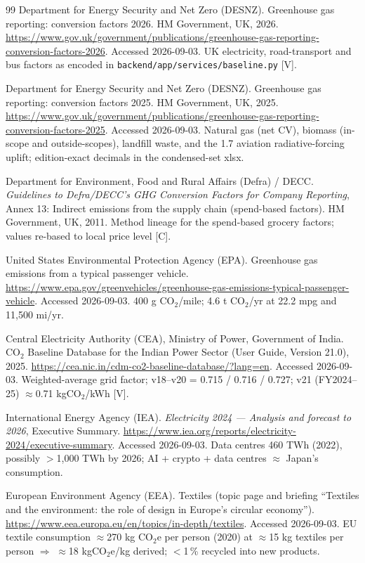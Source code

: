 \documentclass[11pt,a4paper]{article}
\begin{document}
\begin{thebibliography}{99}
Department for Energy Security and Net Zero (DESNZ). Greenhouse gas reporting: conversion factors 2026. HM Government, UK, 2026.
\url{https://www.gov.uk/government/publications/greenhouse-gas-reporting-conversion-factors-2026}. Accessed 2026-09-03.
UK electricity, road-transport and bus factors as encoded in \texttt{backend/app/services/baseline.py} [V].

Department for Energy Security and Net Zero (DESNZ). Greenhouse gas reporting: conversion factors 2025. HM Government, UK, 2025.
\url{https://www.gov.uk/government/publications/greenhouse-gas-reporting-conversion-factors-2025}. Accessed 2026-09-03.
Natural gas (net CV), biomass (in-scope and outside-scopes), landfill waste, and the 1.7 aviation radiative-forcing uplift; edition-exact decimals in the condensed-set xlsx.

Department for Environment, Food and Rural Affairs (Defra) / DECC. \textit{Guidelines to Defra/DECC's GHG Conversion Factors for Company Reporting}, Annex 13: Indirect emissions from the supply chain (spend-based factors). HM Government, UK, 2011.
Method lineage for the spend-based grocery factors; values re-based to local price level [C].

United States Environmental Protection Agency (EPA). Greenhouse gas emissions from a typical passenger vehicle.
\url{https://www.epa.gov/greenvehicles/greenhouse-gas-emissions-typical-passenger-vehicle}. Accessed 2026-09-03.
400 g CO$_2$/mile; 4.6 t CO$_2$/yr at 22.2 mpg and 11{,}500 mi/yr.

Central Electricity Authority (CEA), Ministry of Power, Government of India. CO$_2$ Baseline Database for the Indian Power Sector (User Guide, Version 21.0), 2025.
\url{https://cea.nic.in/cdm-co2-baseline-database/?lang=en}. Accessed 2026-09-03.
Weighted-average grid factor; v18--v20 = 0.715 / 0.716 / 0.727; v21 (FY2024--25) $\approx$0.71 kgCO$_2$/kWh [V].

International Energy Agency (IEA). \textit{Electricity 2024 --- Analysis and forecast to 2026}, Executive Summary.
\url{https://www.iea.org/reports/electricity-2024/executive-summary}. Accessed 2026-09-03.
Data centres 460 TWh (2022), possibly $>$1{,}000 TWh by 2026; AI + crypto + data centres $\approx$ Japan's consumption.

European Environment Agency (EEA). Textiles (topic page and briefing ``Textiles and the environment: the role of design in Europe's circular economy'').
\url{https://www.eea.europa.eu/en/topics/in-depth/textiles}. Accessed 2026-09-03.
EU textile consumption $\approx$270 kg CO$_2$e per person (2020) at $\approx$15 kg textiles per person $\Rightarrow$ $\approx$18 kgCO$_2$e/kg derived; $<$1\,\% recycled into new products.


\end{thebibliography}
\end{document}
